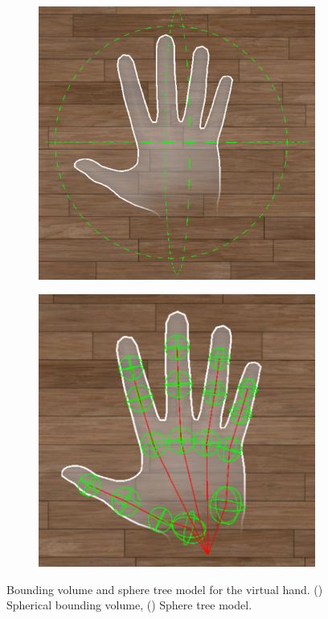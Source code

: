 \begin{figure}
  \begin{subfigure}{0.48\linewidth} %
    \centering
    \includegraphics[width=\linewidth]{image/bounding-volume.pdf}
    \caption{} %
    \label{fig:bounding-volume}
  \end{subfigure}
  \hfill %
  \begin{subfigure}{0.48\linewidth} %
    \centering
    \includegraphics[width=\linewidth]{image/sphere-tree-model.pdf}
    \caption{} %
    \label{fig:sphere-tree-model}
  \end{subfigure}
  \caption{Bounding volume and sphere tree model for the virtual hand. () Spherical bounding volume, () Sphere tree model.}
  \label{fig:bounding-volume-and-sphere-tree-model}
\end{figure}

